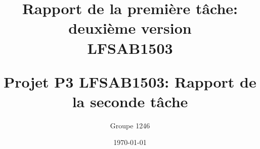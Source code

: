 \documentclass{report}
\author{Groupe 1246 }
\title{\vspace{\fill}\begin{LARGE} \begin{bf}
Rapport de la première tâche: deuxième version \\
LFSAB1503 \\
\end{bf}\end{LARGE}
\vspace{\fill}}
\begin{document}
\title{Projet P3 LFSAB1503: Rapport de la seconde tâche}
\date{\today} 
\newpage
\maketitle
\newpage
\tableofcontents
\newpage
\end{document}

